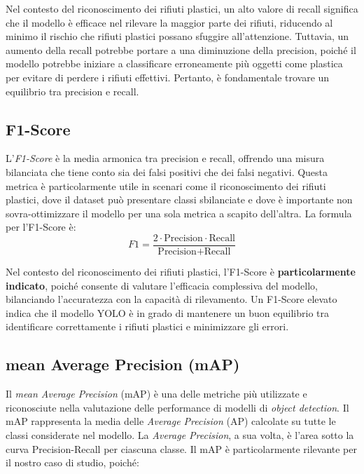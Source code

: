 Nel contesto del riconoscimento dei rifiuti plastici, un alto valore di recall significa che il modello è efficace nel rilevare la maggior parte dei rifiuti, riducendo al minimo il rischio che rifiuti plastici possano sfuggire all'attenzione. Tuttavia, un aumento della recall potrebbe portare a una diminuzione della precision, poiché il modello potrebbe iniziare a classificare erroneamente più oggetti come plastica per evitare di perdere i rifiuti effettivi. Pertanto, è fondamentale trovare un equilibrio tra precision e recall.

\subsection*{F1-Score}

L'\textit{F1-Score} è la media armonica tra precision e recall, offrendo una misura bilanciata che tiene conto sia dei falsi positivi che dei falsi negativi. Questa metrica è particolarmente utile in scenari come il riconoscimento dei rifiuti plastici, dove il dataset può presentare classi sbilanciate e dove è importante non sovra-ottimizzare il modello per una sola metrica a scapito dell'altra. La formula per l'F1-Score è:
\begin{equation}
F1 = \frac{2 \cdot \text{Precision} \cdot \text{Recall}}{\text{Precision} + \text{Recall}}
\end{equation}

Nel contesto del riconoscimento dei rifiuti plastici, l'F1-Score è \textbf{particolarmente indicato}, poiché consente di valutare l'efficacia complessiva del modello, bilanciando l'accuratezza con la capacità di rilevamento. Un F1-Score elevato indica che il modello YOLO è in grado di mantenere un buon equilibrio tra identificare correttamente i rifiuti plastici e minimizzare gli errori.

\subsection*{mean Average Precision (mAP)}

Il \textit{mean Average Precision} (mAP) è una delle metriche più utilizzate e riconosciute nella valutazione delle performance di modelli di \textit{object detection}. Il mAP rappresenta la media delle \textit{Average Precision} (AP) calcolate su tutte le classi considerate nel modello. La \textit{Average Precision}, a sua volta, è l'area sotto la curva Precision-Recall per ciascuna classe. Il mAP è particolarmente rilevante per il nostro caso di studio, poiché:

